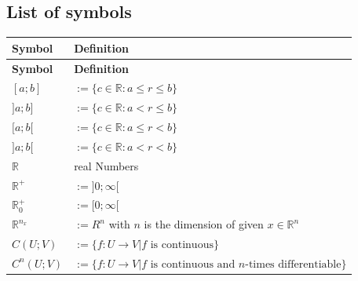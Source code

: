 \documentclass[a4paper]{article}
\theoremstyle{definitions}
\theoremstyle{bemerkung}
\theoremstyle{satz}
\theoremstyle{satz}
\begin{document}
\subsection*{List of symbols}
 \begin{longtable}{l l}
    \toprule \textbf{Symbol} & \textbf{Definition} \tabularnewline
    \midrule
    \endfirsthead
    \toprule \textbf{Symbol} & \textbf{Definition}\tabularnewline
    \midrule
    \endhead 

    $[a;b]$                       & $:=\{c\in \mathbb{R}: a\leq r\leq b\}$\\
    $]a;b]$                       & $:=\{c\in \mathbb{R}: a< r\leq b\}$\\
    $[a;b[$                       & $:=\{c\in \mathbb{R}: a\leq r<b\}$\\
    $]a;b[$                       & $:=\{c\in \mathbb{R}:  a< r<b\}$\\
    $\mathbb{R}$                  & real Numbers \\
    $\mathbb{R}^+$                & $:=]0;\infty[$ \\
    $\mathbb{R}^+_0$              & $:=[0;\infty[$  \\
    $\mathbb{R}^{n_x}$            & $:= R^n$ with $n$ is the dimension of given $x\in \mathbb{R}^n$\\
    $C(U;V)$                      & $:=\{f:U\to V | f \text{ is continuous}\}$\\
    $C^n (U;V)$                   & $:=\{f:U\to V | f \text{ is continuous and } n\text{-times differentiable}\}$\\
    \bottomrule %
\end{longtable} 
\end{document}
